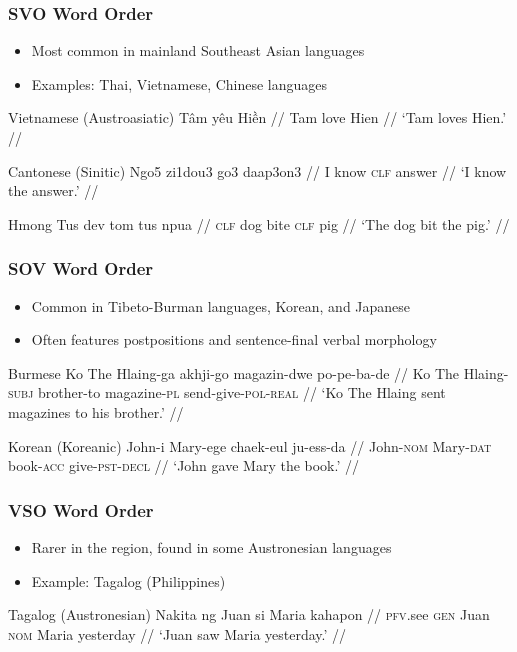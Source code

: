 \documentclass{beamer}
\begin{document}
\begin{frame}[allowframebreaks]
\frametitle{SVO Word Order}
\begin{itemize}
\item Most common in mainland Southeast Asian languages
\item Examples: Thai, Vietnamese, Chinese languages
\end{itemize}
\begin{exampleblock}{Vietnamese (Austroasiatic)}
  \ex
  \begingl
\gla Tâm yêu Hiền //
\glb Tam love Hien //
\glft `Tam loves Hien.' //
\endgl
\xe
\end{exampleblock}

\framebreak

\begin{exampleblock}{Cantonese (Sinitic)}
  \ex
  \begingl
\gla Ngo5 zi1dou3 go3 daap3on3 //
\glb I know \textsc{clf} answer //
\glft `I know the answer.' //
\endgl
\xe
\end{exampleblock}
\begin{exampleblock}{Hmong}
  \ex
  \begingl
\gla Tus dev tom tus npua //
\glb \textsc{clf} dog bite \textsc{clf} pig //
\glft `The dog bit the pig.' //
\endgl
\xe
\end{exampleblock}
\end{frame}

\begin{frame}
\frametitle{SOV Word Order}
\begin{itemize}
\item Common in Tibeto-Burman languages, Korean, and Japanese
\item Often features postpositions and sentence-final verbal morphology
\end{itemize}
\begin{exampleblock}{Burmese}
  \ex
  \begingl
\gla Ko The Hlaing-ga akhji-go magazin-dwe po-pe-ba-de //
\glb Ko The Hlaing-\textsc{subj} brother-to magazine-\textsc{pl} send-give-\textsc{pol}-\textsc{real} //
\glft `Ko The Hlaing sent magazines to his brother.' //
\endgl
\xe
\end{exampleblock}
\begin{exampleblock}{Korean (Koreanic)}
  \ex
  \begingl
\gla John-i Mary-ege chaek-eul ju-ess-da //
\glb John-\textsc{nom} Mary-\textsc{dat} book-\textsc{acc} give-\textsc{pst}-\textsc{decl} //
\glft `John gave Mary the book.' //
\endgl
\xe
\end{exampleblock}
\end{frame}

\begin{frame}
\frametitle{VSO Word Order}
\begin{itemize}
\item Rarer in the region, found in some Austronesian languages
\item Example: Tagalog (Philippines)
\end{itemize}
\begin{exampleblock}{Tagalog (Austronesian)}
  \ex
  \begingl
\gla Nakita ng Juan si Maria kahapon //
\glb \textsc{pfv}.see \textsc{gen} Juan \textsc{nom} Maria yesterday //
\glft `Juan saw Maria yesterday.' //
\endgl
\xe
\end{exampleblock}
\end{frame}
\end{document}
